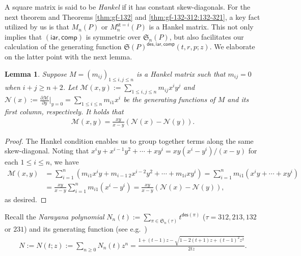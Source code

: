 \documentclass[12pt]{amsart}
\numberwithin{equation}{section}
\theoremstyle{plain}
\newtheorem{lemma}[theorem]{Lemma}
\theoremstyle{definition}
\def\des{\mathsf{des}}
\def\S{\mathfrak{S}}
\def\iar{\mathsf{iar}}
\def\comp{\mathsf{comp}}
\def\st{\mathsf{st}}
\begin{document}
A square matrix is said to be {\em Hankel} if it has constant skew-diagonals. For the next theorem and Theorems \ref{thm:gf-132} and \ref{thm:gf-132-312:132-321}, a key fact utilized by us is that $M_n(P)$ or $M_n^{\st=i}(P)$ is a Hankel matrix. This not only implies that $(\iar,\comp)$ is symmetric over $\S_n(P)$, but also facilitates our calculation of the generating function $\S(P)^{\des,\iar,\comp}(t,r,p;z)$. We elaborate on the latter point with the next lemma. 


\begin{lemma}\label{gf:Hankel}
Suppose $M=(m_{ij})_{1\le i,j\le n}$ is a Hankel matrix such that $m_{ij}=0$ when $i+j\ge n+2$. Let $\mathcal{M}(x,y):=\sum_{1\le i,j\le n}m_{ij}x^iy^j$ and $\mathcal{N}(x):=\frac{\partial \mathcal{M}}{\partial y}|_{y=0}=\sum_{1\le i\le n}m_{i1}x^i$ be the generating functions of $M$ and its first column, respectively. It holds that
\begin{align}
\mathcal{M}(x,y)=\frac{xy}{x-y}(\mathcal{N}(x)-\mathcal{N}(y)).
\end{align}
\end{lemma}
\begin{proof}
The Hankel condition enables us to group together terms along the same skew-diagonal. Noting that $x^iy+x^{i-1}y^2+\cdots+xy^i=xy(x^i-y^i)/(x-y)$ for each $1\le i\le n$, we have
\begin{align*}
\mathcal{M}(x,y) &= \sum_{i=1}^n (m_{i1}x^iy+m_{i-1\:2}x^{i-2}y^2+\cdots+m_{1i}xy^i)=\sum_{i=1}^n m_{i1}(x^iy+\cdots+xy^i)\\
&= \frac{xy}{x-y}\sum_{i=1}^n m_{i1}(x^i-y^i)=\frac{xy}{x-y}(\mathcal{N}(x)-\mathcal{N}(y)),
\end{align*}
as desired.
\end{proof}

Recall the {\em Narayana polynomial} $N_n(t):=\sum_{\pi\in\S_n(\tau)}t^{\des(\pi)}$ ($\tau=312, 213, 132$ or $231$) and its generating function (see e.g.~\cite[Eq.~2.6]{pet})
\begin{align}\label{def:N}
N:=N(t;z):=\sum_{n\ge 0}N_n(t)z^n=\frac{1+(t-1)z-\sqrt{1-2(t+1)z+(t-1)^2z^2}}{2tz}.
\end{align}
 
\end{document}
